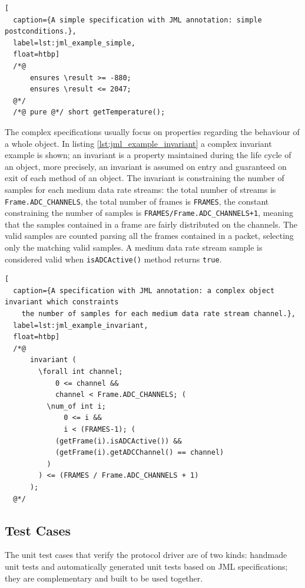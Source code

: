 \documentclass[english]{lni}
\newcommand{\lil}[1]{\texttt{\lstinline|#1|}}
\begin{document}
\begin{lstlisting}[
  caption={A simple specification with JML annotation: simple postconditions.},
  label=lst:jml_example_simple,
  float=htbp]
  /*@ 
      ensures \result >= -880; 
      ensures \result <= 2047; 
  @*/ 
  /*@ pure @*/ short getTemperature();
\end{lstlisting}

\sloppy

The complex specifications usually focus on properties regarding the behaviour of a whole object.
In listing \ref{lst:jml_example_invariant} a complex invariant example is shown; an invariant is a property maintained during the life cycle of an object, more precisely, an invariant is assumed on entry and guaranteed on exit of each method of an object. 
The invariant is constraining the number of samples for each medium data rate streams: the total number of streams is \lil{Frame.ADC_CHANNELS}, the total number of frames is \lil{FRAMES}, the constant constraining the number of samples is \lil{FRAMES/Frame.ADC_CHANNELS+1}, meaning that the samples contained in a frame are fairly distributed on the channels.
The valid samples are counted parsing all the frames contained in a packet, selecting only the matching valid samples.  
A medium data rate stream sample is considered valid when \lil{isADCActive()} method returns \lil{true}.

\fussy

\begin{lstlisting}[
  caption={A specification with JML annotation: a complex object invariant which constraints 
    the number of samples for each medium data rate stream channel.},
  label=lst:jml_example_invariant,
  float=htbp]
  /*@ 
      invariant ( 
        \forall int channel; 
            0 <= channel && 
            channel < Frame.ADC_CHANNELS; ( 
          \num_of int i; 
              0 <= i && 
              i < (FRAMES-1); (
            (getFrame(i).isADCActive()) && 
            (getFrame(i).getADCChannel() == channel)
          ) 
        ) <= (FRAMES / Frame.ADC_CHANNELS + 1) 
      ); 
  @*/
\end{lstlisting}



\subsection{Test Cases}
\label{subsec:test_cases}

The unit test cases that verify the protocol driver are of two kinds: handmade unit tests and automatically generated unit tests based on JML specifications; they are complementary and built to be used together.  
\end{document}

